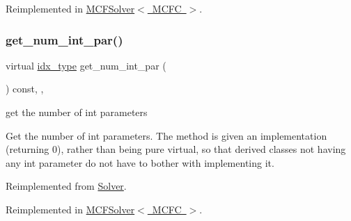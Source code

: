 Reimplemented in \mbox{\hyperlink{class_s_m_spp__di__unipi__it_1_1_m_c_f_solver_a842fd454acaded84baf6b77e0d61a950}{M\+C\+F\+Solver$<$ M\+C\+F\+C $>$}}.

\mbox{\label{class_s_m_spp__di__unipi__it_1_1_c_d_a_solver_a3ad74d9506761eb2ca4c8a936fb7a1c5}} 
\subsubsection{\texorpdfstring{get\+\_\+num\+\_\+int\+\_\+par()}{get\_num\_int\_par()}}
{\footnotesize\ttfamily virtual \mbox{\hyperlink{class_s_m_spp__di__unipi__it_1_1_thin_compute_interface_aa3d710629ad8c434286726ad810c3b47}{idx\+\_\+type}} get\+\_\+num\+\_\+int\+\_\+par (\begin{DoxyParamCaption}\item[{void}]{ }\end{DoxyParamCaption}) const\hspace{0.3cm}{\ttfamily [inline]}, {\ttfamily [override]}, {\ttfamily [virtual]}}



get the number of int parameters 

Get the number of int parameters. The method is given an implementation (returning 0), rather than being pure virtual, so that derived classes not having any int parameter do not have to bother with implementing it. 

Reimplemented from \mbox{\hyperlink{class_s_m_spp__di__unipi__it_1_1_solver_a3ad74d9506761eb2ca4c8a936fb7a1c5}{Solver}}.



Reimplemented in \mbox{\hyperlink{class_s_m_spp__di__unipi__it_1_1_m_c_f_solver_a3ad74d9506761eb2ca4c8a936fb7a1c5}{M\+C\+F\+Solver$<$ M\+C\+F\+C $>$}}.

\mbox{\label{class_s_m_spp__di__unipi__it_1_1_c_d_a_solver_a4247feaa72c255f28a2a71b5e634b60a}} 
